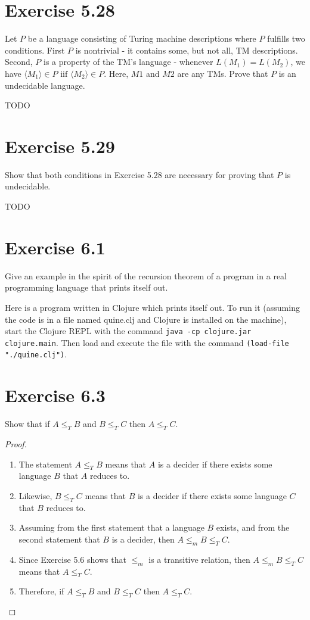 \documentclass{article}
\begin{document}
\section{Exercise 5.28}

Let $P$ be a language consisting of Turing machine descriptions where $P$
fulfills two conditions. First $P$ is nontrivial - it contains some, but not
all, TM descriptions. Second, $P$ is a property of the TM's language - whenever
$L(M_1) = L(M_2)$, we have $\langle M_1 \rangle \in P \text{ iif } \langle M_2
\rangle \in P$. Here, $M1$ and $M2$ are any TMs. Prove that $P$ is an
undecidable language.

TODO

\section{Exercise 5.29}

Show that both conditions in Exercise 5.28 are necessary for proving that $P$ is
undecidable.

TODO

\section{Exercise 6.1}

Give an example in the spirit of the recursion theorem of a program in a real
programming language that prints itself out.

Here is a program written in Clojure which prints itself out. To run it
(assuming the code is in a file named quine.clj and Clojure is installed on the
machine), start the Clojure REPL with the 
command \verb|java -cp clojure.jar clojure.main|. Then load and execute the file
with the command \verb|(load-file "./quine.clj")|.



\section{Exercise 6.3}

Show that if $A \leq_T B$ and $B \leq_T C$ then $A \leq_T C$.

\begin{proof}
	\mbox{}
	\begin{enumerate}
	  \item The statement $A \leq_T B$ means that $A$ is a decider if there exists
	  some language $B$ that $A$ reduces to. 
	  \item Likewise, $B \leq_T C$ means that $B$ is a decider if there exists some
	  language $C$ that $B$ reduces to. 
	  \item Assuming from the first statement that a language $B$ exists, and from
	  the second statement that $B$ is a decider, then $A \leq_m B \leq_T C$.  
	  \item Since Exercise 5.6 shows that $\leq_m$ is a transitive relation,
	  then $A \leq_m B \leq_T C$ means that $A \leq_T C$. 
	  \item Therefore, if $A \leq_T B$ and $B \leq_T C$ then $A \leq_T C$. \qedhere
	\end{enumerate}
\end{proof}
\end{document}
